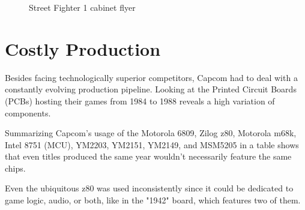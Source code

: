 \begin{figure}[H]
\caption*{Street Fighter 1 cabinet flyer}
\end{figure}


\section{Costly Production}
Besides facing technologically superior competitors, Capcom had to deal with a constantly evolving production pipeline. Looking at the Printed Circuit Boards (PCBs) hosting their games from 1984 to 1988 reveals a high variation of components.

Summarizing Capcom's usage of the Motorola 6809, Zilog z80, Motorola m68k, Intel 8751 (MCU), YM2203, YM2151, YM2149, and MSM5205 in a table shows that even titles produced the same year wouldn't necessarily feature the same chips. 

Even the ubiquitous z80 was used inconsistently since it could be dedicated to game logic, audio, or both, like in the "1942" board, which features two of them.



